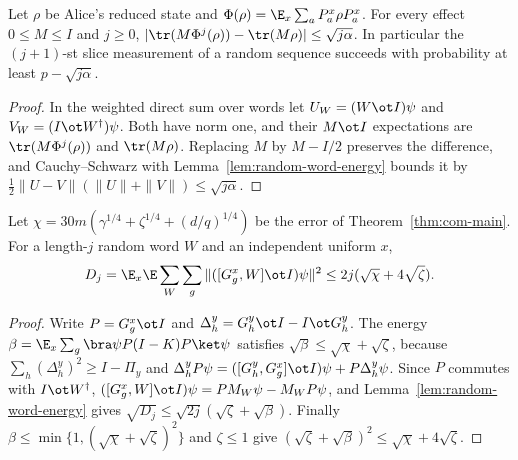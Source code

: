 \begin{lemma}\label{lem:sequential-bot-marginal}
	\leanok
	Let $\rho$ be Alice's reduced state and
	$\Phi(\rho)=\E_x\sum_aP^x_a\rho P^x_a$.  For every effect $0\le M\le I$
	and $j\ge0$,
	$|\tr(M\Phi^j(\rho))-\tr(M\rho)|\le\sqrt{j\alpha}$.  In particular the
	$(j+1)$-st slice measurement of a random sequence succeeds with
	probability at least $p-\sqrt{j\alpha}$.
\end{lemma}
\begin{proof}
	\leanok
	In the weighted direct sum over words let $U_W=(W\ot I)\psi$ and
	$V_W=(I\ot W^\dagger)\psi$.  Both have norm one, and their $M\ot I$
	expectations are $\tr(M\Phi^j(\rho))$ and $\tr(M\rho)$.  Replacing $M$ by
	$M-I/2$ preserves the difference, and Cauchy--Schwarz with
	Lemma~\ref{lem:random-word-energy} bounds it by
	$\frac12\|U-V\|(\|U\|+\|V\|)\le\sqrt{j\alpha}$.
\end{proof}

\begin{lemma}\label{lem:commute-g-half-sandwich}
	\leanok
	Let $\chi=30m(\gamma^{1/4}+\zeta^{1/4}+(d/q)^{1/4})$ be the error of
	Theorem~\ref{thm:com-main}.  For a length-$j$ random word $W$ and an
	independent uniform $x$,
	\[
		D_j=\E_x\E\sum_W\sum_g\|([G^x_g,W]\ot I)\psi\|^2
		\le2j(\sqrt\chi+4\sqrt\zeta).
	\]
\end{lemma}
\begin{proof}
	\leanok
	Write $P=G^x_g\ot I$ and $\Delta^y_h=G^y_h\ot I-I\ot G^y_h$.  The energy
	$\beta=\E_x\sum_g\bra\psi P(I-K)P\ket\psi$ satisfies
	$\sqrt\beta\le\sqrt\chi+\sqrt\zeta$, because
	$\sum_h(\Delta^y_h)^2\ge I-\Pi_y$ and
	$\Delta^y_hP\psi=([G^y_h,G^x_g]\ot I)\psi+P\Delta^y_h\psi$.  Since $P$
	commutes with $I\ot W^\dagger$,
	$([G^x_g,W]\ot I)\psi=PM_W\psi-M_WP\psi$, and
	Lemma~\ref{lem:random-word-energy} gives
	$\sqrt{D_j}\le\sqrt{2j}(\sqrt\zeta+\sqrt\beta)$.  Finally
	$\beta\le\min\{1,(\sqrt\chi+\sqrt\zeta)^2\}$ and $\zeta\le1$ give
	$(\sqrt\zeta+\sqrt\beta)^2\le\sqrt\chi+4\sqrt\zeta$.
\end{proof}

